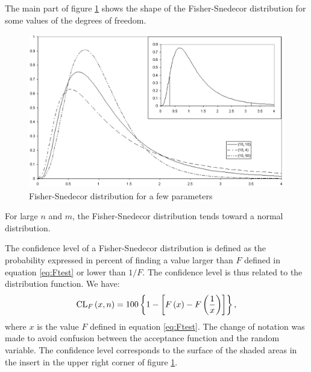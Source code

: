 The main part of figure \ref{fig:fsnedecorDistr} shows the shape
of the Fisher-Snedecor distribution for some values of the degrees
of freedom.
\begin{figure}
\centering\includegraphics[width=12cm]{Figures/FisherSnedecorDistribution}
\caption{Fisher-Snedecor distribution for a few parameters}\label{fig:fsnedecorDistr}
\end{figure}
For large $n$ and $m$, the Fisher-Snedecor distribution
tends toward a normal distribution.


The confidence level of a Fisher-Snedecor distribution is defined
as the probability expressed in percent of finding a value larger
than $F$ defined in equation \ref{eq:Ftest} or lower than $1/F$.
The confidence level is thus related to the distribution function.
We have:
\begin{equation}
\label{eq:fcl}
  {\mathop{\textrm{CL}}}_F\left(x,n\right)=100\left\{1-\left[F\left(x\right)-F\left({1\over x}\right)
  \right]\right\},
\end{equation}
where $x$ is the value $F$ defined in equation \ref{eq:Ftest}. The
change of notation was made to avoid confusion between the
acceptance function and the random variable.  The confidence level
corresponds to the surface of the shaded areas in the insert in
the upper right corner of figure \ref{fig:fsnedecorDistr}.

